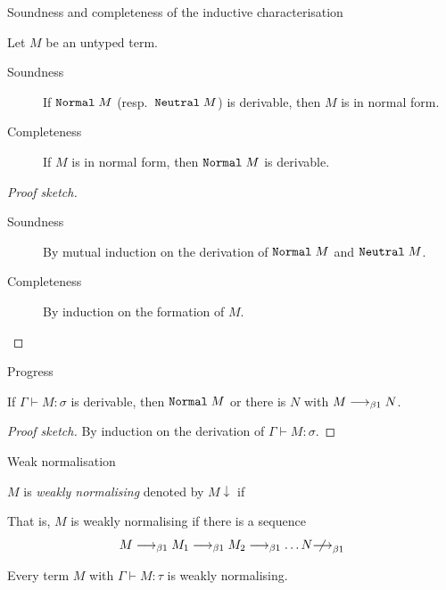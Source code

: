 \begin{frame}{Soundness and completeness of the inductive characterisation}
  \begin{lemma}
    Let $M$ be an untyped term.
    \begin{description}
      \item[Soundness] If $\normal\;M$ (resp.\ $\neutral\;M$) is derivable, then $M$ is in normal form.
      \item[Completeness]
        If $M$ is in normal form, then $\normal\;M$ is derivable.
    \end{description}
  \end{lemma}
  \begin{proof}[Proof sketch]
    \begin{description}
      \item[Soundness] By mutual induction on the derivation of
    $\normal\;M$ and $\neutral\;M$.
      \item[Completeness] By induction on the formation of $M$.
    \end{description}
  \end{proof}

  
\end{frame}
\begin{frame}{Progress}
  \begin{theorem}
    If $\Gamma \vdash M : \sigma$ is derivable, then $\normal\;M$ or there is $N$ with $M \onereduce N$.
  \end{theorem}
  \begin{proof}[Proof sketch]
    By induction on the derivation of $\Gamma \vdash M : \sigma$. 
  \end{proof}
\end{frame}


\begin{frame}{Weak normalisation}
  \begin{definition}
    $M$ is \emph{weakly normalising} denoted by $M\downarrow$ if 
    \begin{multicols}{2}
      \begin{prooftree}
      \end{prooftree}
      \columnbreak
      \begin{prooftree}
      \end{prooftree}
    \end{multicols}
  \end{definition}
  That is, $M$ is weakly normalising if there is a sequence
  \[
    M \onereduce M_1 \onereduce M_2 \onereduce \dots N \notonereduce 
  \]
  \begin{theorem}
    Every term $M$ with $\Gamma \vdash M : \tau$ is weakly normalising.
  \end{theorem}

\end{frame}

